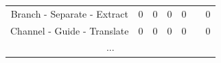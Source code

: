 \begin{table}[t]
\begin{tabular}{|c|c|c|c|c|l|c|}
Branch - Separate - Extract & 0                                                           & 0                                                                   & 0                                                              & 0                                                       &                      & 0        \\ \cline{1-5} \cline{7-7} 
Channel - Guide - Translate & 0                                                           & 0                                                                   & 0                                                              & 0                                                       &                      & 0        \\ \cline{1-5} \cline{7-7}
\multicolumn{7}{|c|}{...}                                                                                                                                                                                                                                                                                                    \\ \hline
\end{tabular}
\end{table}

